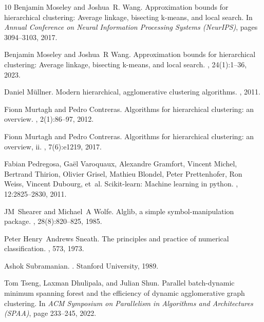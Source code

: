 \documentclass[11pt]{article}
\begin{document}
\begin{thebibliography}{10}
Benjamin Moseley and Joshua~R. Wang.
\newblock Approximation bounds for hierarchical clustering: Average linkage, bisecting k-means, and local search.
\newblock In {\em Annual Conference on Neural Information Processing Systems (NeurIPS)}, pages 3094--3103, 2017.

Benjamin Moseley and Joshua~R Wang.
\newblock Approximation bounds for hierarchical clustering: Average linkage, bisecting k-means, and local search.
, 24(1):1--36, 2023.

Daniel M{\"u}llner.
\newblock Modern hierarchical, agglomerative clustering algorithms.
, 2011.

Fionn Murtagh and Pedro Contreras.
\newblock Algorithms for hierarchical clustering: an overview.
, 2(1):86--97, 2012.

Fionn Murtagh and Pedro Contreras.
\newblock Algorithms for hierarchical clustering: an overview, ii.
, 7(6):e1219, 2017.

Fabian Pedregosa, Ga{\"e}l Varoquaux, Alexandre Gramfort, Vincent Michel, Bertrand Thirion, Olivier Grisel, Mathieu Blondel, Peter Prettenhofer, Ron Weiss, Vincent Dubourg, et~al.
\newblock Scikit-learn: Machine learning in python.
, 12:2825--2830, 2011.

JM~Shearer and Michael~A Wolfe.
\newblock Alglib, a simple symbol-manipulation package.
, 28(8):820--825, 1985.

Peter Henry~Andrews Sneath.
\newblock The principles and practice of numerical classification.
, 573, 1973.

Ashok Subramanian.
.
\newblock Stanford University, 1989.

Tom Tseng, Laxman Dhulipala, and Julian Shun.
\newblock Parallel batch-dynamic minimum spanning forest and the efficiency of dynamic agglomerative graph clustering.
\newblock In {\em ACM Symposium on Parallelism in Algorithms and Architectures (SPAA)}, page 233–245, 2022.


\end{thebibliography}
\end{document}
